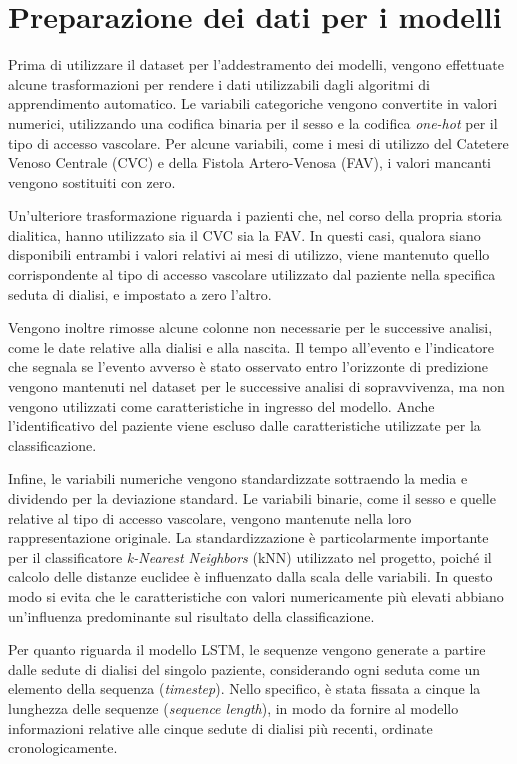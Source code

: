 \documentclass[a4paper,12pt]{report}
\begin{document}
\section{Preparazione dei dati per i modelli}

Prima di utilizzare il dataset per l'addestramento dei modelli, vengono effettuate alcune trasformazioni per rendere i dati utilizzabili dagli algoritmi di apprendimento automatico. Le variabili categoriche vengono convertite in valori numerici, utilizzando una codifica binaria per il sesso e la codifica \textit{one-hot} per il tipo di accesso vascolare. Per alcune variabili, come i mesi di utilizzo del Catetere Venoso Centrale (CVC) e della Fistola Artero-Venosa (FAV), i valori mancanti vengono sostituiti con zero.

Un'ulteriore trasformazione riguarda i pazienti che, nel corso della propria storia dialitica, hanno utilizzato sia il CVC sia la FAV. In questi casi, qualora siano disponibili entrambi i valori relativi ai mesi di utilizzo, viene mantenuto quello corrispondente al tipo di accesso vascolare utilizzato dal paziente nella specifica seduta di dialisi, e impostato a zero l'altro.

Vengono inoltre rimosse alcune colonne non necessarie per le successive analisi, come le date relative alla dialisi e alla nascita. Il tempo all'evento e l'indicatore che segnala se l'evento avverso è stato osservato entro l'orizzonte di predizione vengono mantenuti nel dataset per le successive analisi di sopravvivenza, ma non vengono utilizzati come caratteristiche in ingresso del modello. Anche l'identificativo del paziente viene escluso dalle caratteristiche utilizzate per la classificazione.

Infine, le variabili numeriche vengono standardizzate sottraendo la media e dividendo per la deviazione standard. Le variabili binarie, come il sesso e quelle relative al tipo di accesso vascolare, vengono mantenute nella loro rappresentazione originale. La standardizzazione è particolarmente importante per il classificatore \textit{k-Nearest Neighbors} (kNN) utilizzato nel progetto, poiché il calcolo delle distanze euclidee è influenzato dalla scala delle variabili. In questo modo si evita che le caratteristiche con valori numericamente più elevati abbiano un'influenza predominante sul risultato della classificazione.

Per quanto riguarda il modello LSTM, le sequenze vengono generate a partire dalle sedute di dialisi del singolo paziente, considerando ogni seduta come un elemento della sequenza (\textit{timestep}). Nello specifico, è stata fissata a cinque la lunghezza delle sequenze (\textit{sequence length}), in modo da fornire al modello informazioni relative alle cinque sedute di dialisi più recenti, ordinate cronologicamente.
\end{document}
